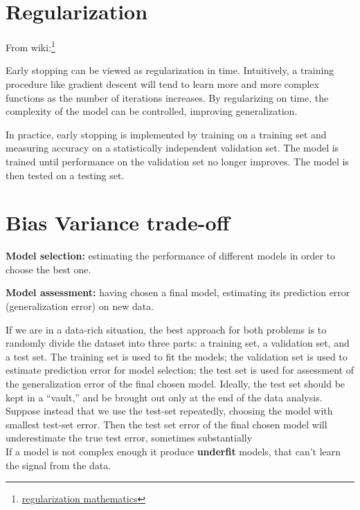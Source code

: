 \section{Regularization}

\cite[p.~17]{lecture2}

From wiki:\footnote{\href{https://www.wikiwand.com/en/Regularization_(mathematics)}{regularization mathematics}}

Early stopping can be viewed as regularization in time. Intuitively, a training procedure like gradient descent will tend to learn more and more complex functions as the number of iterations increases. By regularizing on time, the complexity of the model can be controlled, improving generalization.

In practice, early stopping is implemented by training on a training set and measuring accuracy on a statistically independent validation set. The model is trained until performance on the validation set no longer improves. The model is then tested on a testing set.

\section{Bias Variance trade-off}

\textbf{Model selection:} estimating the performance of different models in order to choose the best one.

\textbf{Model assessment:} having chosen a final model, estimating its prediction error (generalization error) on new data.

If we are in a data-rich situation, the best approach for both problems is to randomly divide the dataset into three parts: a training set, a validation set, and a test set. The training set is used to fit the models; the validation set is used to estimate prediction error for model selection; the test set is used for assessment of the generalization error of the final chosen model.
Ideally, the test set should be kept in a “vault,” and be brought out only at the end of the data analysis. Suppose instead that we use the test-set repeatedly, choosing the model with smallest test-set error. Then the test set error of the final chosen model will underestimate the true test error, sometimes substantially \cite[p.~222]{friedman2016elements}\\

If a model is not complex enough it produce \textbf{underfit} models, that can't learn the signal from the data.\\

